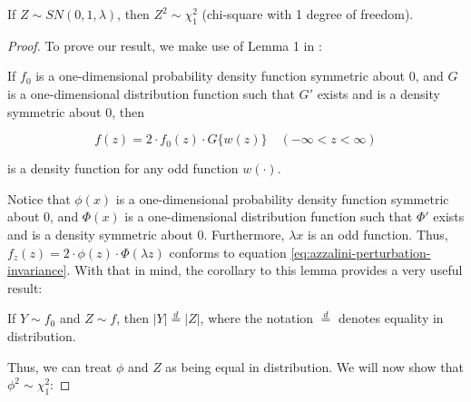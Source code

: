 \documentclass{article}
\begin{document}
\begin{property} \label{prop:3}
  If $Z \sim SN(0, 1, \lambda)$, then $Z^2 \sim \chi^2_1$ (chi-square with 1 degree of freedom).
\end{property}

\begin{proof}
  To prove our result, we make use of Lemma 1 in \citet{azzalini}:

  \begin{helper-lem}
    If $f_0$ is a one-dimensional probability density function symmetric about
    0, and $G$ is a one-dimensional distribution function such that $G'$ exists
    and is a density symmetric about 0, then

    \begin{equation}
      \label{eq:azzalini-perturbation-invariance}
      f(z) = 2 \cdot f_0(z) \cdot G\{w(z)\} \quad (-\infty < z < \infty)
    \end{equation}

    is a density function for any odd function $w(\cdot)$.
  \end{helper-lem}

  Notice that $\phi(x)$ is a one-dimensional probability density function
  symmetric about 0, and $\Phi(x)$ is a one-dimensional distribution function
  such that $\Phi'$ exists and is a density symmetric about 0. Furthermore,
  $\lambda x$ is an odd function. Thus, $f_z(z) = 2 \cdot \phi(z) \cdot
  \Phi(\lambda z)$ conforms to equation
  \eqref{eq:azzalini-perturbation-invariance}. With that in mind, the corollary
  to this lemma provides a very useful result:

  \begin{helper-cor}
    If $Y \sim f_0$ and $Z \sim f$, then $|Y| \overset{d}{=} |Z|$, where the
    notation $\overset{d}{=}$ denotes equality in distribution.    
  \end{helper-cor}

  Thus, we can treat $\phi$ and $Z$ as being equal in distribution. We will now
  show that $\phi^2 \sim \chi^2_1$:


\end{proof}
\end{document}
